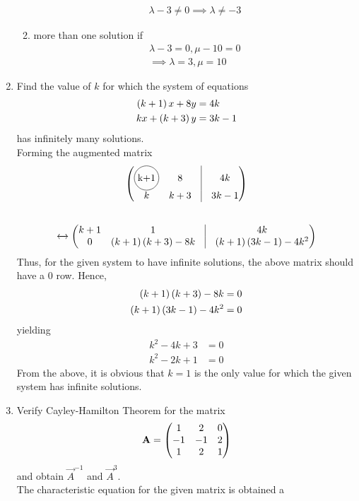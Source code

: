 \documentclass[journal,12pt,twocolumn]{IEEEtran}
\renewcommand\thesection{\arabic{section}}
\begin{document}
\begin{enumerate}[label=\thesection.\arabic*.,ref=\thesection.\theenumi]
\begin{enumerate}
\begin{align}
	\lambda -3 \ne 0 \implies \lambda \ne -3 
  \end{align}
			\item more than one solution if 
\begin{align}
	\lambda -3 = 0, \mu - 10 = 0
	\\
 \implies 
	\lambda =3, \mu = 10
  \end{align}
				\end{enumerate}
			\item Find the value of $k$ for which the system of equations
\begin{align}
	\left(k+1\right)x+8y &= 4k
	\\
	kx+\left(k+3\right)y &= 3k-1
\end{align}
has infinitely many solutions.
\\
\solution Forming the augmented matrix 
\begin{align}
	\myvec{\circled{k+1} & 8 & \vrule &  4k\\ k & k+3 & \vrule & 3k-1}
  \end{align}
  {\tiny
\begin{align}
	\\
	\xleftrightarrow[]{}
	\myvec{k+1 & 1 & \vrule &  4k\\ 0 & \brak{k+1}\brak{k+3}-8k & \vrule & \brak{k+1}\brak{3k-1}-4k^2}
  \end{align}
  }
  Thus, for the given system to have infinite solutions, the above matrix should have a 0 row.  Hence, 
\begin{align}
	\left(k+1\right)\left(k+3\right)-8k & = 0
	\\
	\left(k+1\right)\left(3k-1\right)-4k^2 &=0
  \end{align}
  yielding 
\begin{align}
	k^2 -4k +3 &= 0
	\\
	k^2 -2k +1  &= 0
  \end{align}
  From the above, it is obvious that $k = 1$ is the only value for which the given system has infinite solutions.
\item Verify Cayley-Hamilton Theorem for the matrix 
\begin{align}
	\mathbf{A} = 	\begin{pmatrix}1 & 2 & 0\\-1 & -1 & 2 \\ 1 & 2 & 1\end{pmatrix}
\end{align}
		and obtain $\vec{A}^{-1}$ and $\vec{A}^{3}$.
		\\
		\solution The characteristic equation for the given matrix is obtained a
\begin{align}

\end{align}
\end{enumerate}
\end{document}
